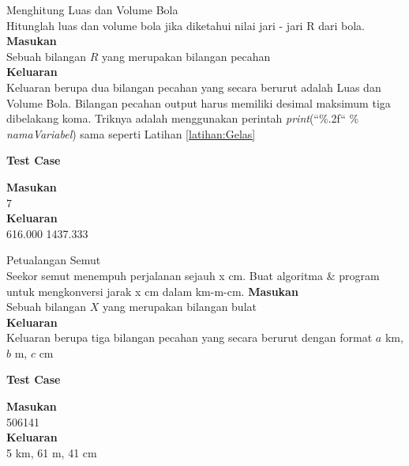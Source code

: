 \begin{permasalahan}{Menghitung Luas dan Volume Bola}\\
\label{prob:Volume}
	Hitunglah luas dan volume bola jika diketahui nilai jari - jari R dari bola.
	\textbf{Masukan}\\
	Sebuah bilangan $R$ yang merupakan bilangan pecahan\\
	\textbf{Keluaran}\\
	Keluaran berupa dua bilangan pecahan yang secara berurut adalah Luas dan Volume Bola. Bilangan pecahan output harus memiliki desimal maksimum tiga dibelakang koma. Triknya adalah menggunakan perintah  \textit{print}(``\%.2f`` \% \textit{namaVariabel}) sama seperti Latihan \ref{latihan:Gelas}
	\begin{center}
	\textbf{Test Case}\\
	\end{center}
	\textbf{Masukan}\\
	7\\
	\textbf{Keluaran}\\
	616.000 1437.333\\	
\end{permasalahan}

\begin{permasalahan}{Petualangan Semut}\\
\label{prob:PetualanganSemut}
	Seekor semut menempuh perjalanan sejauh x cm. Buat algoritma \& program untuk mengkonversi jarak x cm dalam km-m-cm.
	\textbf{Masukan}\\
	Sebuah bilangan $X$ yang merupakan bilangan bulat\\
	\textbf{Keluaran}\\
	Keluaran berupa tiga bilangan pecahan yang secara berurut dengan format $a$ km, $b$ m, $c$ cm
	\begin{center}
	\textbf{Test Case}\\
	\end{center}
	\textbf{Masukan}\\
	506141\\
	\textbf{Keluaran}\\
	5 km, 61 m, 41 cm
\end{permasalahan}

